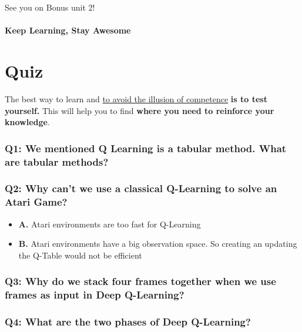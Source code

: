 \documentclass[11pt,a4paper]{article}
\begin{document}
See you on Bonus unit 2!

\paragraph{Keep Learning, Stay Awesome}\label{keep-learning-stay-awesome}

\section{Quiz}\label{quiz}

The best way to learn and \href{https://www.coursera.org/lecture/learning-how-to-learn/illusions-of-competence-BuFzf}{to avoid the illusion of competence} \textbf{is to test yourself.} This will help you to find \textbf{where you need to reinforce your knowledge}.

\subsubsection{Q1: We mentioned Q Learning is a tabular method. What are tabular methods?}\label{q1-we-mentioned-q-learning-is-a-tabular-method.-what-are-tabular-methods}

\subsubsection{Q2: Why can't we use a classical Q-Learning to solve an Atari Game?}\label{q2-why-cant-we-use-a-classical-q-learning-to-solve-an-atari-game}

\begin{itemize}
\tightlist
\item
  \textbf{A.} Atari environments are too fast for Q-Learning
\item
  \textbf{B.} Atari environments have a big observation space. So creating an updating the Q-Table would not be efficient
\end{itemize}

\subsubsection{Q3: Why do we stack four frames together when we use frames as input in Deep Q-Learning?}\label{q3-why-do-we-stack-four-frames-together-when-we-use-frames-as-input-in-deep-q-learning}

\subsubsection{Q4: What are the two phases of Deep Q-Learning?}\label{q4-what-are-the-two-phases-of-deep-q-learning}
\end{document}
